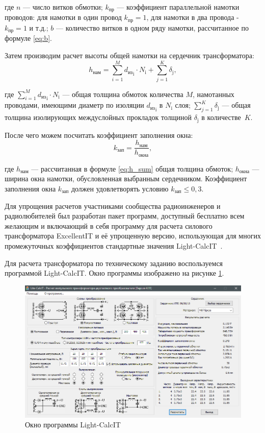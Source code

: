 \documentclass[utf8x, 14pt, oneside, a4paper]{article}
\begin{document}
		\noindent где $n$ --- число витков обмотки; $k_{\text{пр}}$ --- коэффициент параллельной намотки проводов: для намотки в один провод $k_{\text{пр}} = 1$, для намотки в два провода - $k_{\text{пр}} = 1$ и т.д.; $b$ --- количество витков в одном ряду намотки, рассчитанное по формуле \ref{eq:b}.
		
		Затем производим расчет высоты общей намотки на сердечник трансформатора:
		\begin{equation}
			h_{\text{нам}} = {\sum\limits_{i=1}^M {d_{\text{из}}}_{\text{i}} \cdot N_{\text{i}}} + \sum\limits_{j=1}^K {\delta_{\text{j}}},
			\label{eq:h_sum}
		\end{equation}
	
		\noindent где $\sum\limits_{i=1}^M {d_{\text{из}}}_{\text{i}} \cdot N_{\text{i}}$ --- общая толщина обмоток количества $M$, намотанных проводами, имеющими диаметр по изоляции ${d_{\text{из}}}_{\text{i}}$ в $N_{\text{i}}$ слоя; $\sum\limits_{j=1}^K {\delta_{\text{j}}}$ --- общая толщина изолирующих междуслойных прокладок толщиной $\delta_{\text{j}}$ в количестве~$K$.
		
		После чего можем посчитать коэффициент заполнения окна:
		\begin{equation}
			k_{\text{зап}} = \frac{h_{\text{нам}}}{h_{\text{окна}}},
			\label{eq:k_zap}
		\end{equation}
	
		\noindent где $h_{\text{нам}}$ --- рассчитанная в формуле \ref{eq:h_sum} общая толщина обмоток; $h_{\text{окна}}$ --- ширина окна намотки, обусловленная выбранным сердечником. Коэффициент заполнения окна $k_{\text{зап}}$ должен удовлетворять условию $k_{\text{зап}} \leqslant 0,3$.
		
		Для упрощения расчетов участниками сообщества радиоинженеров и радиолюбителей был разработан пакет программ, доступный бесплатно всем желающим и включающий в себя программу для расчета силового трансформатора ExcellentIT и её упрощенную версию, использующая для многих промежуточных коэффициентов стандартные значения Light-CalcIT~\cite{bib:excellentIT}.
		
		Для расчета трансформатора по техническому заданию воспользуемся программой Light-CalcIT. Окно программы изображено на рисунке \ref{fig:calcIT}.
		
		\begin{figure}[H]
			\centering
			\includegraphics[width=0.9\linewidth]{"Рисунки/LightCalcIT"}
			\caption{Окно программы Light-CalcIT}
			\label{fig:calcIT}
		\end{figure}
	
\end{document}
